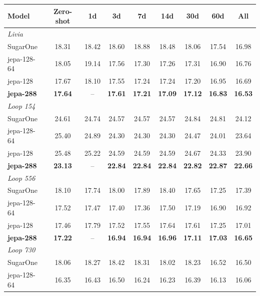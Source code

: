 \begin{table}[ht]
    \centering
    \small
    \begin{tabular}{lcccccccc}
        \hline
        Model & Zero-shot & 1d & 3d & 7d & 14d & 30d & 60d & All \\
        \hline
        \multicolumn{9}{l}{\textit{Livia}} \\
        SugarOne & 18.31 & 18.42 & 18.60 & 18.88 & 18.48 & 18.06 & 17.54 & 16.98 \\
        jepa-128-64 & 18.05 & 19.14 & 17.56 & 17.30 & 17.26 & 17.31 & 16.90 & 16.76 \\
        jepa-128 & 17.67 & 18.10 & 17.55 & 17.24 & 17.24 & 17.20 & 16.95 & 16.69 \\
        \textbf{jepa-288} & \textbf{17.64} & -- & \textbf{17.61} & \textbf{17.21} & \textbf{17.09} & \textbf{17.12} & \textbf{16.83} & \textbf{16.53} \\
        \hline
        \multicolumn{9}{l}{\textit{Loop 154}} \\
        SugarOne & 24.61 & 24.74 & 24.57 & 24.57 & 24.57 & 24.84 & 24.81 & 24.12 \\
        jepa-128-64 & 25.40 & 24.89 & 24.30 & 24.30 & 24.30 & 24.47 & 24.01 & 23.64 \\
        jepa-128 & 25.48 & 25.22 & 24.59 & 24.59 & 24.59 & 24.67 & 24.33 & 23.90 \\
        \textbf{jepa-288} & \textbf{23.13} & -- & \textbf{22.84} & \textbf{22.84} & \textbf{22.84} & \textbf{22.82} & \textbf{22.87} & \textbf{22.66} \\
        \hline
        \multicolumn{9}{l}{\textit{Loop 556}} \\
        SugarOne & 18.10 & 17.74 & 18.00 & 17.89 & 18.40 & 17.65 & 17.25 & 17.39 \\
        jepa-128-64 & 17.52 & 17.47 & 17.40 & 17.36 & 17.50 & 17.19 & 16.90 & 16.92 \\
        jepa-128 & 17.46 & 17.79 & 17.52 & 17.55 & 17.64 & 17.61 & 17.25 & 17.01 \\
        \textbf{jepa-288} & \textbf{17.22} & -- & \textbf{16.94} & \textbf{16.94} & \textbf{16.96} & \textbf{17.11} & \textbf{17.03} & \textbf{16.65} \\
        \hline
        \multicolumn{9}{l}{\textit{Loop 730}} \\
        SugarOne & 18.06 & 18.27 & 18.42 & 18.31 & 18.02 & 18.23 & 16.52 & 16.50 \\
        jepa-128-64 & 16.35 & 16.43 & 16.50 & 16.24 & 16.23 & 16.39 & 16.13 & 16.06 \\

\end{tabular}
\end{table}

